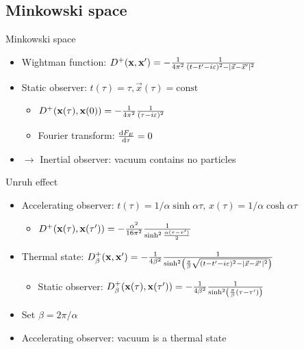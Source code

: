 \documentclass{beamer}
\renewcommand{\va}[1]{\vec{#1}}
\let\todox\todo
\renewcommand\todo[1]{\todox[inline]{#1}}
\begin{document}
\subsection{Minkowski space}
\begin{frame}{Minkowski space}
\begin{itemize}
	\item Wightman function: \(D^+(\vb{x},\vb{x}') = -\frac{1}{4\pi^2} \frac{1}{(t-t'-i\varepsilon)^2 - |\va{x}-\va{x}'|^2}\)
	\item Static observer: \(t(\tau) = \tau, \va{x}(\tau) = \mathrm{const}\)
	\begin{itemize}
		\item \(D^+(\vb{x}(\tau),\vb{x}(0)) = -\frac{1}{4\pi^2} \frac{1}{(\tau-i\varepsilon)^2}\)
		\item Fourier transform: \(\dv{F_E}{\tau} = 0\)
	\end{itemize}
	\item[]\(\to\) Inertial observer: vacuum contains no particles
\end{itemize}
\todo{image}
\end{frame}

\begin{frame}{Unruh effect}
\begin{itemize}
	\item Accelerating observer: \(t(\tau) = 1/\alpha \sinh \alpha\tau,\,x(\tau) = 1/\alpha \cosh \alpha\tau\)
	\begin{itemize}
		\item \(D^+(\vb{x}(\tau), \vb{x}(\tau')) = -\frac{\alpha^2}{16\pi^2} \frac{1}{\sinh^2\frac{\alpha(\tau-\tau')}{2}}\)
	\end{itemize}
	\item Thermal state: \(D^+_\beta(\vb{x},\vb{x}') = -\frac{1}{4\beta^2} \frac{1}{\sinh[2](\frac{\pi}{\beta}\sqrt{(t-t'-i\varepsilon)^2 - |\va{x}-\va{x}'|^2})}\)
	\begin{itemize}
		\item Static observer: \(D^+_\beta(\vb{x}(\tau),\vb{x}(\tau')) = -\frac{1}{4\beta^2} \frac{1}{\sinh[2](\frac{\pi}{\beta} (\tau-\tau'))}\)
	\end{itemize}
	\item Set \(\beta = 2\pi/\alpha\)
	\item Accelerating observer: vacuum is a thermal state
\end{itemize}
\end{frame}
\end{document}

